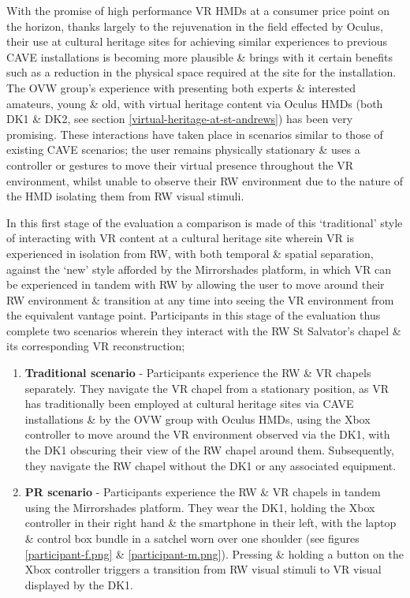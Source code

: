 With the promise of high performance VR HMDs at a consumer price point on the horizon, thanks largely to the rejuvenation in the field effected by Oculus, their use at cultural heritage sites for achieving similar experiences to previous CAVE installations is becoming more plausible \& brings with it certain benefits such as a reduction in the physical space required at the site for the installation. The OVW group's experience with presenting both experts \& interested amateurs, young \& old, with virtual heritage content via Oculus HMDs (both DK1 \& DK2, see section \ref{virtual-heritage-at-st-andrews}) has been very promising. These interactions have taken place in scenarios similar to those of existing CAVE scenarios; the user remains physically stationary \& uses a controller or gestures to move their virtual presence throughout the VR environment, whilst unable to observe their RW environment due to the nature of the HMD isolating them from RW visual stimuli.

In this first stage of the evaluation a comparison is made of this `traditional' style of interacting with VR content at a cultural heritage site wherein VR is experienced in isolation from RW, with both temporal \& spatial separation, against the `new' style afforded by the Mirrorshades platform, in which VR can be experienced in tandem with RW by allowing the user to move around their RW environment \& transition at any time into seeing the VR environment from the equivalent vantage point. Participants in this stage of the evaluation thus complete two scenarios wherein they interact with the RW St Salvator's chapel \& its corresponding VR reconstruction;

\begin{enumerate}
	\item \textbf{Traditional scenario} - Participants experience the RW \& VR chapels separately. They navigate the VR chapel from a stationary position, as VR has traditionally been employed at cultural heritage sites via CAVE installations \& by the OVW group with Oculus HMDs, using the Xbox controller to move around the VR environment observed via the DK1, with the DK1 obscuring their view of the RW chapel around them. Subsequently, they navigate the RW chapel without the DK1 or any associated equipment.
	\item \textbf{PR scenario} - Participants experience the RW \& VR chapels in tandem using the Mirrorshades platform. They wear the DK1, holding the Xbox controller in their right hand \& the smartphone in their left, with the laptop \& control box bundle in a satchel worn over one shoulder (see figures \ref{participant-f.png} \& \ref{participant-m.png}). Pressing \& holding a button on the Xbox controller triggers a transition from RW visual stimuli to VR visual displayed by the DK1.
\end{enumerate}

